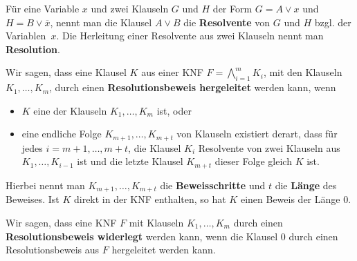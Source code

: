 \begin{defn}
	Für eine Variable $x$ und  zwei Klauseln $G$ und $H$ der Form $G=A \vee x$ und $H=B \vee \overline{x}$, nennt man die Klausel $A \vee B$ die \textbf{Resolvente} von $G$ und $H$ bzgl. der Variablen~$x$.
	Die Herleitung einer Resolvente aus zwei Klauseln nennt man \textbf{Resolution}. 
	
	Wir sagen, dass eine Klausel $K$ aus einer KNF $F = \bigwedge_{i=1}^m K_i$, mit den Klauseln $K_1,\ldots,K_m$, durch einen \textbf{Resolutionsbeweis hergeleitet} werden kann, wenn
	\begin{itemize}
	 \item $K$ eine der Klauseln $K_1,\ldots,K_m $ ist, oder
	 \item eine endliche Folge $K_{m+1},\ldots,K_{m+t}$ von Klauseln existiert derart, dass für jedes $i =m+1,\ldots,m+t$, die Klausel $K_i$ Resolvente von zwei Klauseln aus  $K_1,\ldots,K_{i-1}$ ist und  die letzte Klausel $K_{m+t}$ dieser Folge gleich $K$ ist.
	 \end{itemize}
	 \condclearpage
Hierbei nennt man $K_{m+1},\ldots,K_{m+t}$ die \textbf{Beweisschritte} und $t$ die \textbf{Länge} des Beweises. Ist $K$ direkt in der KNF enthalten, so hat $K$ einen Beweis der Länge $0$. 
	
	Wir sagen, dass eine KNF $F$ mit  Klauseln $K_1,\ldots,K_m$ durch einen \textbf{Resolutionsbeweis widerlegt} werden kann, wenn die Klausel $0$ durch einen Resolutionsbeweis aus $F$ hergeleitet werden kann. 
\end{defn} 

